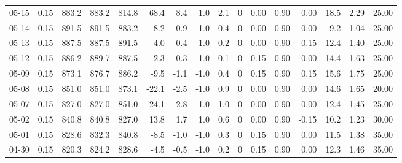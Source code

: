 \begin{threeparttable}
{\begin{tabular}{lrrrrrrrrrrrrrrr}
  05-15 &     0.15 & 883.2 & 883.2 & 814.8 &       68.4 &            8.4 &                      1.0 &                 2.1 &              0 &       0.00 &      0.90 &           0.00 &             18.5 &            2.29 &                  25.00 \\
  05-14 &     0.15 & 891.5 & 891.5 & 883.2 &        8.2 &            0.9 &                      1.0 &                 0.4 &              0 &       0.00 &      0.90 &           0.00 &              9.2 &            1.04 &                  25.00 \\
  05-13 &     0.15 & 887.5 & 887.5 & 891.5 &       -4.0 &           -0.4 &                     -1.0 &                 0.2 &              0 &       0.00 &      0.90 &          -0.15 &             12.4 &            1.40 &                  25.00 \\
  05-12 &     0.15 & 886.2 & 889.7 & 887.5 &        2.3 &            0.3 &                      1.0 &                 0.1 &              0 &       0.15 &      0.90 &           0.00 &             14.4 &            1.63 &                  25.00 \\
  05-09 &     0.15 & 873.1 & 876.7 & 886.2 &       -9.5 &           -1.1 &                     -1.0 &                 0.4 &              0 &       0.15 &      0.90 &           0.15 &             15.6 &            1.75 &                  25.00 \\
  05-08 &     0.15 & 851.0 & 851.0 & 873.1 &      -22.1 &           -2.5 &                     -1.0 &                 0.9 &              0 &       0.00 &      0.90 &           0.00 &             14.6 &            1.65 &                  20.00 \\
  05-07 &     0.15 & 827.0 & 827.0 & 851.0 &      -24.1 &           -2.8 &                     -1.0 &                 1.0 &              0 &       0.00 &      0.90 &           0.00 &             12.4 &            1.45 &                  25.00 \\
  05-02 &     0.15 & 840.8 & 840.8 & 827.0 &       13.8 &            1.7 &                      1.0 &                 0.6 &              0 &       0.00 &      0.90 &          -0.15 &             10.2 &            1.23 &                  30.00 \\
  05-01 &     0.15 & 828.6 & 832.3 & 840.8 &       -8.5 &           -1.0 &                     -1.0 &                 0.3 &              0 &       0.15 &      0.90 &           0.00 &             11.5 &            1.38 &                  35.00 \\
  04-30 &     0.15 & 820.3 & 824.2 & 828.6 &       -4.5 &           -0.5 &                     -1.0 &                 0.2 &              0 &       0.15 &      0.90 &           0.00 &             12.3 &            1.46 &                  35.00 \\

\end{tabular}}
\end{threeparttable}
